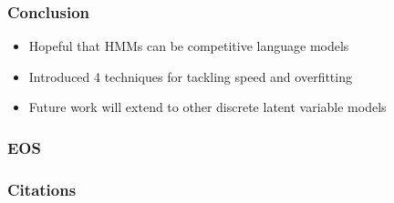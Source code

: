 \documentclass{beamer}
\begin{document}
\begin{frame}
\frametitle{Conclusion}
\begin{itemize}
\item Hopeful that HMMs can be competitive language models
\vspace{2em}
\item Introduced 4 techniques for tackling speed and overfitting
\vspace{2em}
\item Future work will extend to other discrete latent variable models
\end{itemize}
\end{frame}

\begin{frame}
\frametitle{EOS}
\end{frame}


\begin{frame}
\frametitle{Citations}


\end{frame}
\end{document}

